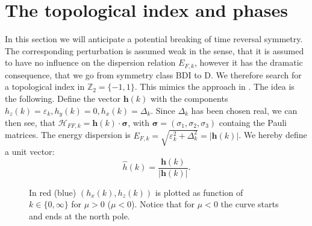\section{The topological index and phases}
\label{sec.topindexandphases}
In this section we will anticipate a potential breaking of time reversal symmetry. The corresponding perturbation is assumed weak in the sense, that it is assumed to have no influence on the dispersion relation $E_{F,k}$, however it has the dramatic consequence, that we go from symmetry class BDI to D. We therefore search for a topological index in $\mathbb{Z}_2=\{-1,1\}$. This mimics the approach in \cite{Alicea}. The idea is the following. Define the vector $\mathbf{h}(k)$ with the components $h_z(k) = \varepsilon_k, h_y(k) = 0, h_x(k) = \Delta_k$. Since $\Delta_k$ has been chosen real, we can then see, that $\mathcal{H}_{FF,k} = \mathbf{h}(k)\cdot\boldsymbol\sigma$, with $\boldsymbol\sigma = (\sigma_1,\sigma_2,\sigma_3)$ containg the Pauli matrices. The energy dispersion is $E_{F,k} = \sqrt{\varepsilon^2_k + \Delta^2_k} = |\mathbf{h}(k)|$. We hereby define a unit vector:
\begin{equation}
\hat{h}(k) = \frac{\mathbf{h}(k)}{|\mathbf{h}(k)|}. 
\label{eq.hhatdefinition}
\end{equation}


\begin{figure}
\center
{}
\caption{In red (blue) $(h_x(k),h_z(k))$ is plotted as function of $k\in \{0, \infty\}$ for $\mu > 0$ ($\mu < 0$). Notice that for $\mu < 0$ the curve starts and ends at the north pole.}
\label{fig.hhatplot}
\end{figure}

